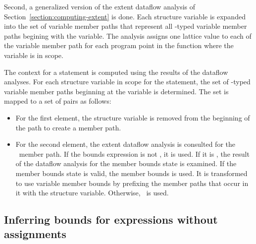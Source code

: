 Second, a generalized version of the extent dataflow analysis of Section~\ref{section:computing-extent}
is done.  Each structure variable is expanded into the set of variable
member paths that represent all \arrayptr-typed variable member paths begining with 
the variable.  The analysis assigns one lattice value to each of the variable member path for
each program point in the function where the variable is in scope.

The context for a statement is computed using the results of the dataflow analyses.
For each structure variable in scope for the statement, the set of \arrayptr-typed variable member paths 
beginning at the variable is determined.  The set is mapped to a set of pairs as follows:
\begin{itemize}
\item For the first element, the structure variable is removed from the beginning of the
path to create a member path.
\item For the second element, the extent dataflow analysis is consulted for the \arrayptr\ member path.
   If the bounds expression is not \boundsunknown, it is used.   If it is \boundsunknown, the result
   of the dataflow analysis for the member bounds state is examined. If the member bounds
   state is valid, the member bounds is used.  It is transformed to use variable member
   bounds by prefixing the member paths that occur in it with the structure variable.
   Otherwise, \boundsunknown\ is used.
\end{itemize}

\subsection{Inferring bounds for expressions without assignments}

